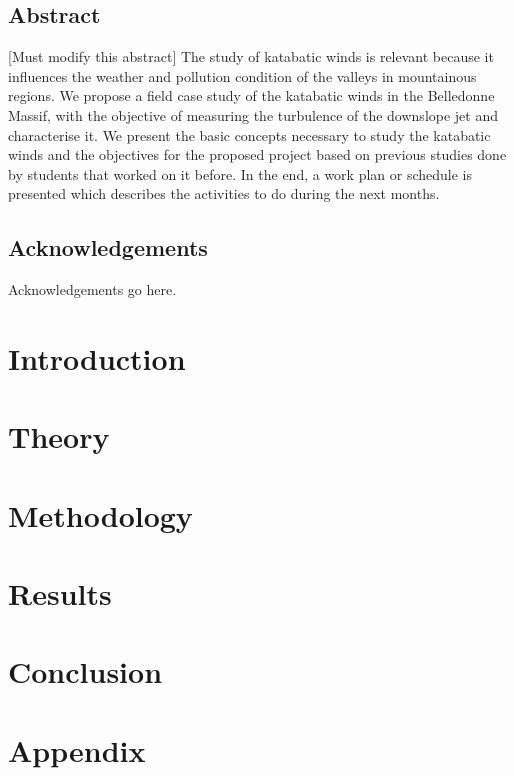 \documentclass[english, a4paper, 12pt, twoside]{report}
\begin{document}
\linespread{1.5}

\restoregeometry %

\thispagestyle{plain} %
\clearpage\mbox{}\clearpage %

\newpage
\linespread{1.25}
\section*{Abstract}
    [Must modify this abstract] The study of katabatic winds is relevant because it influences the weather and pollution condition of the valleys in mountainous regions. We propose a field case study of the katabatic winds in the Belledonne Massif, with the objective of measuring the turbulence of the downslope jet and characterise it. We present the basic concepts necessary to study the katabatic winds and the objectives for the proposed project based on previous studies done by students that worked on it before. In the end, a work plan or schedule is presented which describes the activities to do during the next months.

\newpage

\section*{Acknowledgements}
    Acknowledgements go here.
\newpage

\tableofcontents
\linespread{1}
\listoffigures
\linespread{1.25}
\newpage
{}

\chapter{Introduction}


\chapter{Theory}


\chapter{Methodology} \label{sec:methodology}


\chapter{Results}


\chapter{Conclusion}


\clearpage



\appendix
\chapter{Appendix}

\end{document}

